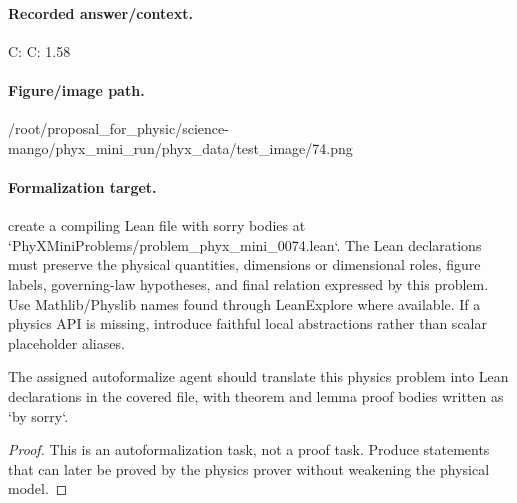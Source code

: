 \paragraph{Recorded answer/context.}
C: C: 1.58

\paragraph{Figure/image path.}
/root/proposal\_for\_physic/science-mango/phyx\_mini\_run/phyx\_data/test\_image/74.png

\paragraph{Formalization target.}
create a compiling Lean file with sorry bodies at `PhyXMiniProblems/problem\_phyx\_mini\_0074.lean`. The Lean declarations must preserve the physical quantities, dimensions or dimensional roles, figure labels, governing-law hypotheses, and final relation expressed by this problem.
Use Mathlib/Physlib names found through LeanExplore where available. If a physics API is missing, introduce faithful local abstractions rather than scalar placeholder aliases.

\begin{theorem}
\label{thm:physics:phyx_mini_0074:target}
The assigned autoformalize agent should translate this physics problem into Lean declarations in the covered file, with theorem and lemma proof bodies written as `by sorry`.
\end{theorem}
\begin{proof}
This is an autoformalization task, not a proof task. Produce statements that can later be proved by the physics prover without weakening the physical model.
\end{proof}

